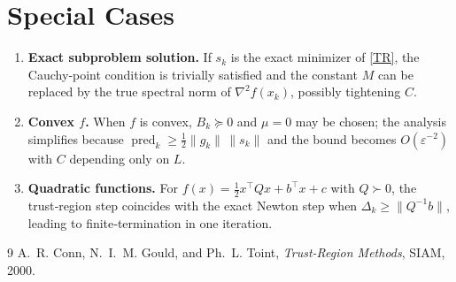 \documentclass{article}
\begin{document}
\section*{Special Cases}
\begin{enumerate}
\item \textbf{Exact subproblem solution.} If $s_k$ is the exact minimizer of \eqref{TR}, the Cauchy‑point condition is trivially satisfied and the constant $M$ can be replaced by the true spectral norm of $\nabla^{2}f(x_k)$, possibly tightening $C$.
\item \textbf{Convex $f$.} When $f$ is convex, $B_k\succeq0$ and $\mu=0$ may be chosen; the analysis simplifies because $\operatorname{pred}_k\ge\frac12\|g_k\|\,\|s_k\|$ and the bound becomes $O(\varepsilon^{-2})$ with $C$ depending only on $L$.
\item \textbf{Quadratic functions.} For $f(x)=\frac12 x^{\top}Qx+b^{\top}x+c$ with $Q\succ0$, the trust‑region step coincides with the exact Newton step when $\Delta_k\ge\|Q^{-1}b\|$, leading to finite‑termination in one iteration.
\end{enumerate}

\begin{thebibliography}{9}
A.~R. Conn, N.~I.~M. Gould, and Ph.~L. Toint,
\emph{Trust-Region Methods},
SIAM, 2000.
\end{thebibliography}
\end{document}
